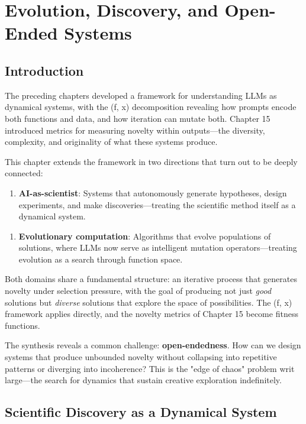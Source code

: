 \chapter{Evolution, Discovery, and Open-Ended Systems}

\section{Introduction}

The preceding chapters developed a framework for understanding LLMs as dynamical systems, with the (f, x) decomposition revealing how prompts encode both functions and data, and how iteration can mutate both. Chapter 15 introduced metrics for measuring novelty within outputs---the diversity, complexity, and originality of what these systems produce.

This chapter extends the framework in two directions that turn out to be deeply connected:

\begin{enumerate}
\item \textbf{AI-as-scientist}: Systems that autonomously generate hypotheses, design experiments, and make discoveries---treating the scientific method itself as a dynamical system.
\end{enumerate}

\begin{enumerate}
\item \textbf{Evolutionary computation}: Algorithms that evolve populations of solutions, where LLMs now serve as intelligent mutation operators---treating evolution as a search through function space.
\end{enumerate}

Both domains share a fundamental structure: an iterative process that generates novelty under selection pressure, with the goal of producing not just \textit{good} solutions but \textit{diverse} solutions that explore the space of possibilities. The (f, x) framework applies directly, and the novelty metrics of Chapter 15 become fitness functions.

The synthesis reveals a common challenge: \textbf{open-endedness}. How can we design systems that produce unbounded novelty without collapsing into repetitive patterns or diverging into incoherence? This is the "edge of chaos" problem writ large---the search for dynamics that sustain creative exploration indefinitely.



\section{Scientific Discovery as a Dynamical System}


